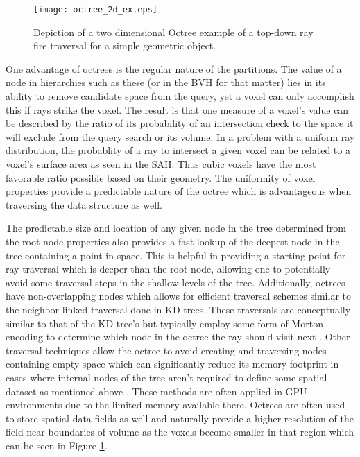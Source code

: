 \begin{figure}[H]
  \centering
  \texttt{[image: octree\_2d\_ex.eps]}
  \caption{Depiction of a two dimensional Octree example of a top-down ray fire traversal for a simple geometric object.}
  \label{fig:2D_octree}
\end{figure}

One advantage of octrees is the regular nature of the partitions. The value of a
node in hierarchies such as these (or in the BVH for that matter) lies in its
ability to remove candidate space from the query, yet a voxel can only
accomplish this if rays strike the voxel. The result is that one measure of a
voxel's value can be described by the ratio of its probability of an
intersection check to the space it will exclude from the query search or its
volume. In a problem with a uniform ray distribution, the probablity of a ray to
intersect a given voxel can be related to a voxel's surface area as seen in the
SAH. Thus cubic voxels have the most favorable ratio possible based on their
geometry. The uniformity of voxel properties provide a predictable nature of the
octree which is advantageous when traversing the data structure as well.

The predictable size and location of any given node in the tree determined from
the root node properties also provides a fast lookup of the deepest node in the
tree containing a point in space. This is helpful in providing a starting point
for ray traversal which is deeper than the root node, allowing one to
potentially avoid some traversal steps in the shallow levels of the
tree. Additionally, octrees have non-overlapping nodes which allows for
efficient traversal schemes similar to the neighbor linked traversal done in
KD-trees. These traversals are conceptually similar to that of the KD-tree's but
typically employ some form of Morton encoding to determine which node in the
octree the ray should visit next \cite{Revelles_2000}. Other traversal
techniques allow the octree to avoid creating and traversing nodes containing
empty space which can significantly reduce its memory footprint in cases where
internal nodes of the tree aren't required to define some spatial dataset as
mentioned above \cite{Samet_1989}. These methods are often applied in GPU
environments due to the limited memory available there. Octrees are often used
to store spatial data fields as well and naturally provide a higher resolution
of the field near boundaries of volume as the voxels become smaller in that
region which can be seen in Figure \ref{fig:2D_octree}.


